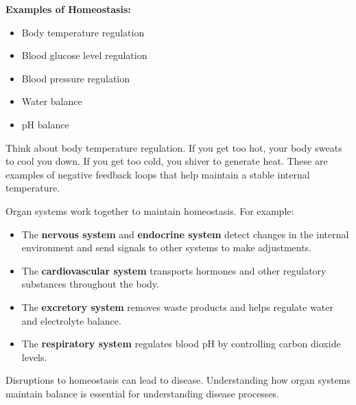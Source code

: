 \begin{marginnote}
\textbf{Examples of Homeostasis:}
\begin{itemize}
    \item Body temperature regulation
    \item Blood glucose level regulation
    \item Blood pressure regulation
    \item Water balance
    \item pH balance
\end{itemize}
\end{marginnote}

\begin{example}
Think about body temperature regulation. If you get too hot, your body sweats to cool you down. If you get too cold, you shiver to generate heat. These are examples of negative feedback loops that help maintain a stable internal temperature.
\end{example}

Organ systems work together to maintain homeostasis. For example:

\begin{itemize}
    \item The \textbf{nervous system} and \textbf{endocrine system} detect changes in the internal environment and send signals to other systems to make adjustments.
    \item The \textbf{cardiovascular system} transports hormones and other regulatory substances throughout the body.
    \item The \textbf{excretory system} removes waste products and helps regulate water and electrolyte balance.
    \item The \textbf{respiratory system} regulates blood pH by controlling carbon dioxide levels.
\end{itemize}

Disruptions to homeostasis can lead to disease.  Understanding how organ systems maintain balance is essential for understanding disease processes.

